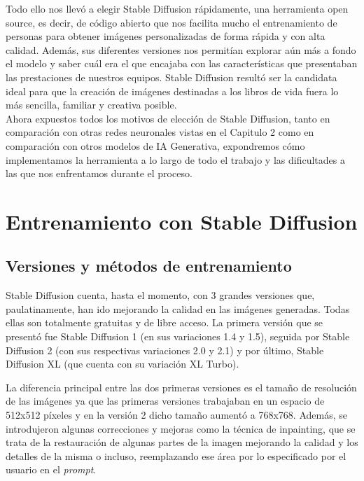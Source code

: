 Todo ello nos llevó a elegir Stable Diffusion rápidamente, una herramienta open source, es decir, de código abierto que nos facilita mucho el entrenamiento de personas para obtener imágenes personalizadas de forma rápida y con alta calidad. Además, sus diferentes versiones nos permitían explorar aún más a fondo el modelo y saber cuál era el que encajaba con las características que presentaban las prestaciones de nuestros equipos. Stable Diffusion resultó ser la candidata ideal para que la creación de imágenes destinadas a  los libros de vida fuera lo más sencilla, familiar y creativa posible. \\

Ahora expuestos todos los motivos de elección de Stable Diffusion, tanto en comparación con otras redes neuronales vistas en el Capitulo 2 como en comparación con otros modelos de IA Generativa, expondremos cómo implementamos la herramienta a lo largo de todo el trabajo y las dificultades a las que nos enfrentamos durante el proceso. \\

\section{Entrenamiento con Stable Diffusion}

\subsection{Versiones y métodos de entrenamiento}

Stable Diffusion cuenta, hasta el momento, con 3 grandes versiones que, paulatinamente, han ido mejorando la calidad en las imágenes generadas. Todas ellas son totalmente gratuitas y de libre acceso. La primera versión que se presentó fue Stable Diffusion 1 (en sus variaciones 1.4 y 1.5), seguida por Stable Diffusion 2 (con sus respectivas variaciones 2.0 y 2.1) y por último, Stable Diffusion XL (que cuenta con su variación XL Turbo). 

La diferencia principal entre las dos primeras versiones es el tamaño de resolución de las imágenes ya que las primeras versiones trabajaban en un espacio de 512x512 píxeles y en la versión 2 dicho tamaño aumentó a 768x768. Además, se introdujeron algunas correcciones y mejoras como la técnica de inpainting, que se trata de la restauración de algunas partes de la imagen mejorando la calidad y los detalles de la misma o incluso, reemplazando ese área por lo especificado por el usuario en el \textit{prompt}.

